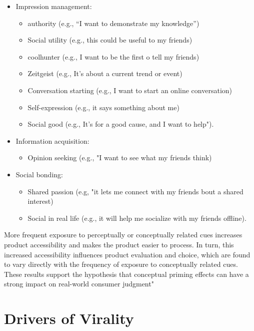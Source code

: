 \documentclass[
]{book}
\providecommand{\tightlist}{%
  \setlength{\itemsep}{0pt}\setlength{\parskip}{0pt}}
\begin{document}
\begin{itemize}
\item
  Impression management:

  \begin{itemize}
  \tightlist
  \item
    authority (e.g., ``I want to demonstrate my knowledge'')
  \item
    Social utility (e.g., this could be useful to my friends)
  \item
    coolhunter (e.g., I want to be the first o tell my friends)
  \item
    Zeitgeist (e.g., It's about a current trend or event)
  \item
    Conversation starting (e.g., I want to start an online conversation)
  \item
    Self-expression (e.g., it says something about me)
  \item
    Social good (e.g., It's for a good cause, and I want to help").
  \end{itemize}
\item
  Information acquisition:

  \begin{itemize}
  \tightlist
  \item
    Opinion seeking (e.g., "I want to see what my friends think)
  \end{itemize}
\item
  Social bonding:

  \begin{itemize}
  \tightlist
  \item
    Shared passion (e.g, "it lets me connect with my friends bout a shared interest)
  \item
    Social in real life (e.g., it will help me socialize with my friends offline).
  \end{itemize}
\end{itemize}

More frequent exposure to perceptually or conceptually related cues increases product accessibility and makes the product easier to process. In turn, this increased accessibility influences product evaluation and choice, which are found to vary directly with the frequency of exposure to conceptually related cues. These results support the hypothesis that conceptual priming effects can have a strong impact on real-world consumer judgment" \citep{Berger_2008}

\hypertarget{drivers-of-virality}{%
\section{Drivers of Virality}\label{drivers-of-virality}}
\end{document}
